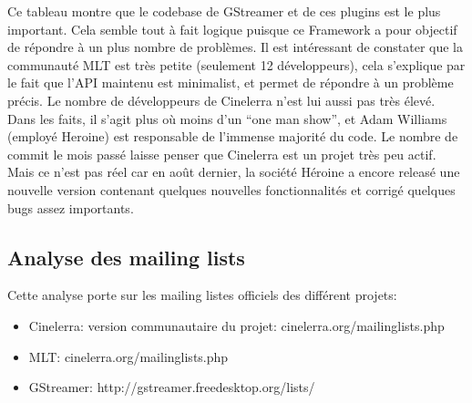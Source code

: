Ce tableau montre que le codebase  de GStreamer et de ces plugins est
le plus important. Cela semble tout à fait logique puisque ce Framework
a pour objectif de répondre à un plus nombre de problèmes. Il est
intéressant de constater que la communauté MLT est très
petite (seulement 12 développeurs), cela s'explique par le fait que
l'API maintenu est minimalist, et permet de répondre à un problème
précis.  Le nombre de développeurs de Cinelerra n'est lui aussi pas
très élevé. Dans les faits, il s'agit plus où moins d'un ``one man
show'', et Adam Williams (employé Heroine) est responsable de l'immense
majorité du code. Le nombre de commit le mois passé laisse penser que
Cinelerra est un projet très peu actif. Mais ce n'est pas réel car
en août dernier, la société Héroine a encore releasé une nouvelle
version contenant quelques nouvelles fonctionnalités et corrigé quelques
bugs assez importants.

\subsection {Analyse des mailing lists}

Cette analyse porte sur les mailing listes officiels des différent
projets:

\begin{itemize}

  \item {Cinelerra: version communautaire du projet:
    cinelerra.org/mailinglists.php}

  \item {MLT: cinelerra.org/mailinglists.php}

  \item {GStreamer: http://gstreamer.freedesktop.org/lists/}

\end{itemize}


